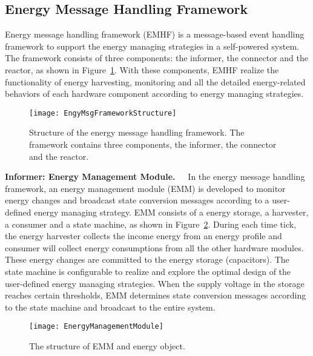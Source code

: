 \subsection{Energy Message Handling Framework}	\label{sec:tech-EMHF}
Energy message handling framework (EMHF) is a message-based event handling framework to support the energy managing strategies in a self-powered system.
The framework consists of three components: the informer, the connector and the reactor, as shown in Figure~\ref{fig:EngyMsgFrameworkStructure}. 
With these components, EMHF realize the functionality of energy harvesting, monitoring and all the detailed energy-related behaviors of each hardware component according to energy managing strategies.

\begin{figure}[!htpb]
	\centering
	\texttt{[image: EngyMsgFrameworkStructure]}
	\vspace{-5pt}
	\caption{Structure of the energy message handling framework. The framework contains three components, the informer, the connector and the reactor.}		\label{fig:EngyMsgFrameworkStructure}
\end{figure}

\textbf{Informer: Energy Management Module.\ \ }
In the energy message handling framework, an energy management module (EMM) is developed to monitor energy changes and broadcast state conversion messages according to a user-defined energy managing strategy.
EMM consists of a energy storage, a harvester, a consumer and a state machine, as shown in Figure~\ref{fig:EnergyManagementModule}. 
During each time tick, the energy harvester collects the income energy from an energy profile and consumer will collect energy consumptions from all the other hardware modules. 
These energy changes are committed to the energy storage (capacitors). 
The state machine is configurable to realize and explore the optimal design of the user-defined energy managing strategies. 
When the supply voltage in the storage reaches certain thresholds, EMM determines state conversion messages according to the state machine and broadcast to the entire system.

\begin{figure}[!htpb]
	\centering
	\vspace{-5pt}
	\texttt{[image: EnergyManagementModule]}
	\vspace{-10pt}
	\caption{The structure of EMM and energy object.}		\label{fig:EnergyManagementModule}
\end{figure}

